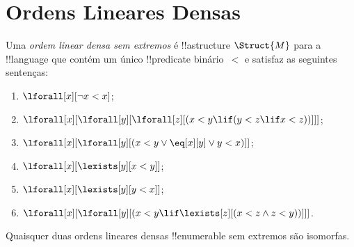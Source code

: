 \documentclass[../../../include/open-logic-section]{subfiles}
\begin{document}
\section{Ordens Lineares Densas}

\begin{defn}
  Uma \emph{ordem linear densa sem extremos} é !!a{structure}
  $\Struct{M}$ para a !!{language} que contém um único
  !!{predicate} binário~$<$ e satisfaz as seguintes sentenças:
  \begin{enumerate}
  \item $\lforall[x][\lnot x < x]$;
  \item $\lforall[x][\lforall[y][\lforall[z][(x < y \lif (y < z \lif x
    <z ))]]]$;
  \item $\lforall[x][\lforall[y][(x< y \lor \eq[x][y] \lor y < x)]]$;
  \item $\lforall[x][\lexists[y][x < y]]$;
  \item $\lforall[x][\lexists[y][y < x]]$;
  \item $\lforall[x][\lforall[y][(x < y \lif \lexists[z][(x < z \land
        z < y))]]]$.
 \end{enumerate}
\end{defn}

\begin{thm}
  Quaisquer duas ordens lineares densas !!{enumerable} sem
  extremos são isomorfas.
\end{thm}
\end{document}
